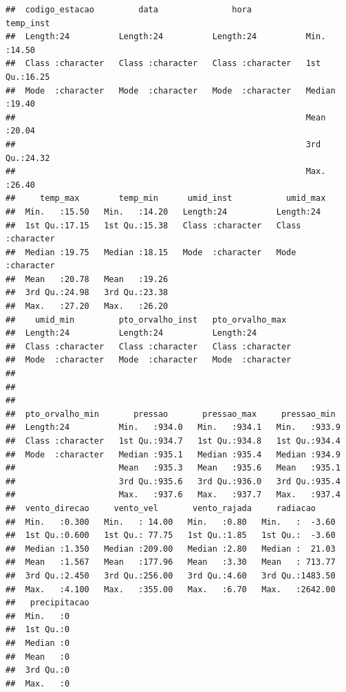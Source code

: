 \documentclass[]{book}
\theoremstyle{definition}
\theoremstyle{definition}
\theoremstyle{definition}
\theoremstyle{remark}
\begin{document}
\begin{verbatim}
##  codigo_estacao         data               hora             temp_inst    
##  Length:24          Length:24          Length:24          Min.   :14.50  
##  Class :character   Class :character   Class :character   1st Qu.:16.25  
##  Mode  :character   Mode  :character   Mode  :character   Median :19.40  
##                                                           Mean   :20.04  
##                                                           3rd Qu.:24.32  
##                                                           Max.   :26.40  
##     temp_max        temp_min      umid_inst           umid_max        
##  Min.   :15.50   Min.   :14.20   Length:24          Length:24         
##  1st Qu.:17.15   1st Qu.:15.38   Class :character   Class :character  
##  Median :19.75   Median :18.15   Mode  :character   Mode  :character  
##  Mean   :20.78   Mean   :19.26                                        
##  3rd Qu.:24.98   3rd Qu.:23.38                                        
##  Max.   :27.20   Max.   :26.20                                        
##    umid_min         pto_orvalho_inst   pto_orvalho_max   
##  Length:24          Length:24          Length:24         
##  Class :character   Class :character   Class :character  
##  Mode  :character   Mode  :character   Mode  :character  
##                                                          
##                                                          
##                                                          
##  pto_orvalho_min       pressao       pressao_max     pressao_min   
##  Length:24          Min.   :934.0   Min.   :934.1   Min.   :933.9  
##  Class :character   1st Qu.:934.7   1st Qu.:934.8   1st Qu.:934.4  
##  Mode  :character   Median :935.1   Median :935.4   Median :934.9  
##                     Mean   :935.3   Mean   :935.6   Mean   :935.1  
##                     3rd Qu.:935.6   3rd Qu.:936.0   3rd Qu.:935.4  
##                     Max.   :937.6   Max.   :937.7   Max.   :937.4  
##  vento_direcao     vento_vel       vento_rajada     radiacao      
##  Min.   :0.300   Min.   : 14.00   Min.   :0.80   Min.   :  -3.60  
##  1st Qu.:0.600   1st Qu.: 77.75   1st Qu.:1.85   1st Qu.:  -3.60  
##  Median :1.350   Median :209.00   Median :2.80   Median :  21.03  
##  Mean   :1.567   Mean   :177.96   Mean   :3.30   Mean   : 713.77  
##  3rd Qu.:2.450   3rd Qu.:256.00   3rd Qu.:4.60   3rd Qu.:1483.50  
##  Max.   :4.100   Max.   :355.00   Max.   :6.70   Max.   :2642.00  
##   precipitacao
##  Min.   :0    
##  1st Qu.:0    
##  Median :0    
##  Mean   :0    
##  3rd Qu.:0    
##  Max.   :0
\end{verbatim}
\end{document}
